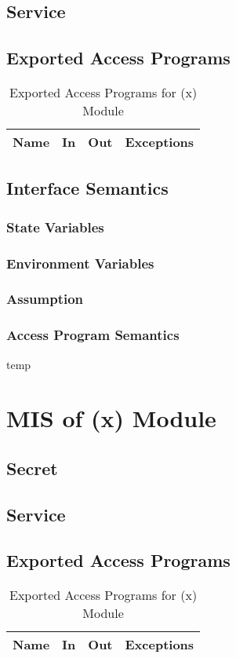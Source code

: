\documentclass[11pt]{article}
\begin{document}
    \subsection{Service}
    \subsection{Exported Access Programs}
    \begin{table}[h]
    \caption{Exported Access Programs for (x) Module}
    \begin{tabular}{p{4cm}p{2cm}p{2cm}p{4cm}}
    Name & In & Out & Exceptions\\
    \hline
    
    \hline
    \end{tabular}
    \end{table}
    \subsection{Interface Semantics}
    \subsubsection{State Variables}
    \subsubsection{Environment Variables}
    \subsubsection{Assumption}
    \subsubsection{Access Program Semantics}
    temp
    \newline
     \section{MIS of (x) Module}
     \subsection{Secret}
    \subsection{Service}
    \subsection{Exported Access Programs}
    \begin{table}[h]
    \caption{Exported Access Programs for (x) Module}
    \begin{tabular}{p{4cm}p{2cm}p{2cm}p{4cm}}
    Name & In & Out & Exceptions\\
    \hline
    
    \hline
    \end{tabular}
    \end{table}
\end{document}
